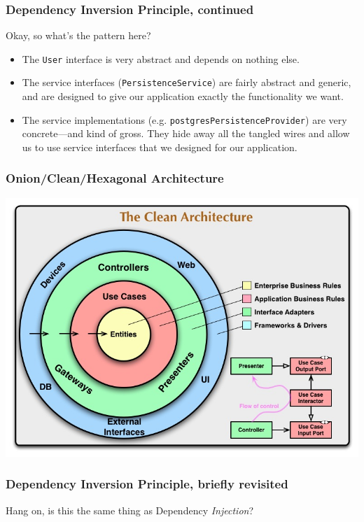 \documentclass[aspectratio=169]{beamer}
\begin{document}
\begin{frame}
  \frametitle{Dependency Inversion Principle, continued}
  Okay, so what's the pattern here?

  \begin{itemize}
    \item The \texttt{User} interface is very abstract and depends on nothing
          else.
    \item The service interfaces (\texttt{PersistenceService}) are fairly
          abstract and generic, and are designed to give our application exactly
          the functionality we want.
    \item The service implementations (e.g.
          \texttt{postgresPersistenceProvider}) are very concrete---and kind of
          gross.  They hide away all the tangled wires and allow us to use
          service interfaces that we designed for our application.
  \end{itemize}
\end{frame}

\begin{frame}
  \frametitle{Onion/Clean/Hexagonal Architecture}
  \centering
  \includegraphics[height=0.8\textheight]{CleanArchitecture.jpg}
\end{frame}

\begin{frame}
  \frametitle{Dependency Inversion Principle, briefly revisited}
  Hang on, is this the same thing as Dependency \textit{Injection}?
\end{frame}
\end{document}
